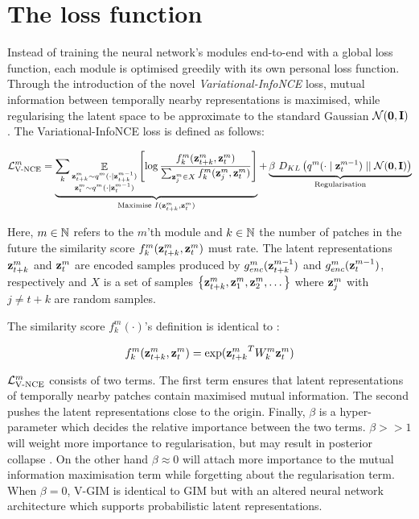 	
		
\section{The loss function} \label{cha:vgim_learning_objective}
	Instead of training the neural network's modules end-to-end with a global loss function, each module is optimised greedily with its own personal loss function. Through the introduction of the novel \textit{Variational-InfoNCE} loss, mutual information between temporally nearby representations is maximised, while regularising the latent space to be approximate to the standard Gaussian $\mathcal{N}(\bm{\mathbf{0}}, \mathbf{I})$. The Variational-InfoNCE loss is defined as follows:
	
	\begin{equation} %
		\Lvnce^m =
		\underbrace{\reconstrgim}_{\text{Maximise } I(\ztk^m, \zt^m)} + \underbrace{\beta ~ \latentspaceconstraintgim}_{\text{Regularisation}}
		\label{eq:variational_gim_loss}
	\end{equation}

	Here, $m \in \mathbb{N}$ refers to the $m$'th module and $k \in \mathbb{N}$ the number of patches in the future the similarity score $f_k^m({\mathbf{z}_{t+k}^m},{\mathbf{z}_t^m})$ must rate. The latent representations $\mathbf{z}_{t+k}^m$ and $\mathbf{z}_t^m$ are encoded samples produced by $g_{enc}^m(\mathbf{z}_{t+k}^{m-1})$ and $g_{enc}^m(\mathbf{z}_t^{m-1})$, respectively and $X$ is a set of samples ${ \left\{ \mathbf{z}_{t+k}^m, \mathbf{z}_1^m, \mathbf{z}_2^m, \dots \right\} }$ where $\mathbf{z}_j^m$ with $j \neq t \! + \! k$ are random samples.


	The similarity score $f_k^m(\cdot)$'s definition is identical to \citep{lowePuttingEndEndtoEnd2020}:
	
	$$ f_k^m(\mathbf{z}_{t+k}^m,\mathbf{z}_t^m) = \exp({\mathbf{z}_{t+k}^m}^TW_k^m\mathbf{z}_t^m) $$
	
	
	$\mathcal{L}_{\text{V-NCE}}^m$ consists of two terms. The first term ensures that latent representations of temporally nearby patches contain maximised mutual information. The second pushes the latent representations close to the origin. Finally, $\beta$ is a hyper-parameter which decides the relative importance between the two terms. $\beta >> 1$ will weight more importance to regularisation, but may result in posterior collapse \citep{lucasUnderstandingPosteriorCollapse2022}. On the other hand $\beta \approx 0$ will attach more importance to the mutual information maximisation term while forgetting about the regularisation term. When $\beta = 0$, V-GIM is identical to GIM but with an altered neural network architecture which supports probabilistic latent representations.
	
